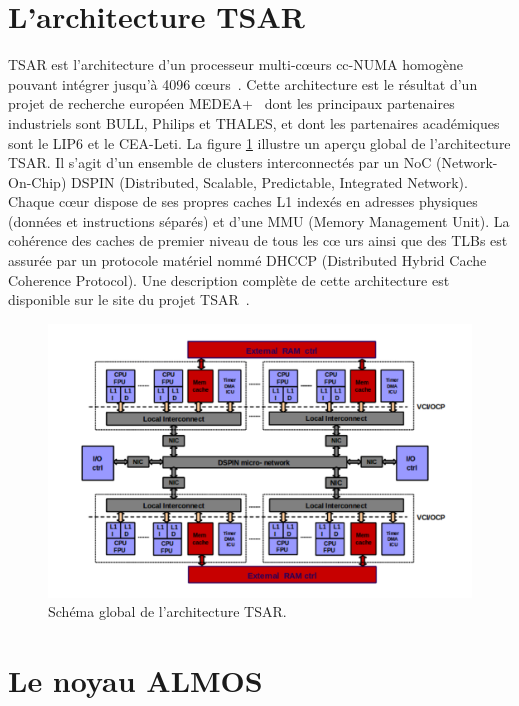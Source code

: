   \section{L'architecture TSAR}
  \label{sec:tsar}

    TSAR est l'architecture d’un processeur multi-c\oe urs cc-NUMA homogène
    pouvant intégrer jusqu’à 4096 c\oe urs~\cite{greiner2009tsar}. Cette
    architecture est le résultat d’un projet de recherche européen
    MEDEA+~\cite{tsar2008} dont les principaux partenaires industriels sont
    BULL, Philips et THALES, et dont les partenaires académiques sont le LIP6 et
    le CEA-Leti. La figure \ref{fig:tsar} illustre un aperçu global de
    l'architecture TSAR. Il s'agit d'un ensemble de clusters interconnectés par
    un NoC (Network-On-Chip) DSPIN (Distributed, Scalable, Predictable,
    Integrated Network). Chaque c\oe ur dispose de ses propres caches L1 indexés
    en adresses physiques (données et instructions séparés) et d'une MMU (Memory
    Management Unit). La cohérence des caches de premier niveau de tous les c\oe
    urs ainsi que des TLBs est assurée par un protocole matériel nommé DHCCP
    (Distributed Hybrid Cache Coherence Protocol). Une description complète de
    cette architecture est disponible sur le site du projet
    TSAR~\cite{tsar2008web}.

    \begin{figure}[!h]
      \centering \includegraphics[scale=0.16]{include/img/tsar.png}
      \caption{Schéma global de l'architecture TSAR.~\cite{greiner2009tsar}}
      \label{fig:tsar}
    \end{figure}
  
  \section{Le noyau ALMOS}
  \label{sec:almos}

